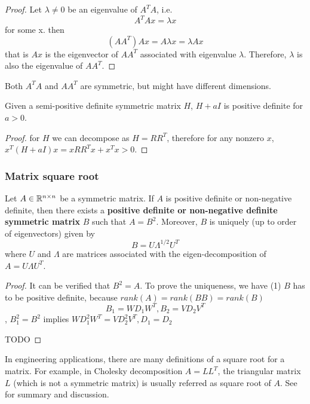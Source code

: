 \begin{refsection}
\begin{proof}
	Let $\lambda \neq 0$ be an eigenvalue of $A^TA$, i.e.
	$$A^TAx = \lambda x$$
	for some x. then
	$$(AA^T)Ax = A\lambda x = \lambda Ax$$
	that is $Ax$ is the eigenvector of $AA^T$ associated with eigenvalue $\lambda$. Therefore, $\lambda$ is also the eigenvalue of $AA^T$.
\end{proof}



\begin{remark}
	Both $A^TA$ and $AA^T$ are symmetric, but might have different dimensions. 
\end{remark}


\begin{lemma}
	Given a semi-positive definite symmetric matrix $H$, $H+aI$ is positive definite for $a > 0$.
\end{lemma}
\begin{proof}
	for $H$ we can decompose as $H = RR^T$, therefore for any nonzero $x$, $x^T(H+aI)x = xRR^Tx + x^Tx > 0$.
\end{proof}

\subsubsection{Matrix square root}
\begin{theorem}\label{ch:linearalgebra:th:matrixSquareRoot}
	Let $A \in \mathbb{R}^{n\times n}$ be a symmetric matrix. If $A$ is positive definite or non-negative definite, then there exists a\textbf{ positive definite or non-negative definite symmetric matrix} $B$ such that $A = B^2$. Moreover, $B$ is uniquely (up to order of eigenvectors) given by
	$$B=U\Lambda^{1/2}U^T$$
	where $U$ and $\Lambda$ are matrices associated with the eigen-decomposition of $A=U\Lambda U^T$.
\end{theorem}
\begin{proof}
	It can be verified that $B^2 = A$. To prove the uniqueness, we have (1) $B$ has to be positive definite, because $rank(A) = rank(BB) = rank(B)$
	$$B_1 = WD_1W^T,B_2=VD_2V^T$$, $B_1^2=B^2$ implies $WD_1^2W^T = VD_2^2V^T,D_1=D_2$
	
	TODO
\end{proof}






\begin{remark}
	In engineering applications, there are many definitions of a square root for a matrix. For example, in Cholesky decomposition $A=LL^T$, the triangular matrix $L$ (which is not a symmetric matrix) is usually referred as square root of $A$. See \cite{rhudy2012evaluation} for summary and discussion.
\end{remark}



\end{refsection}

